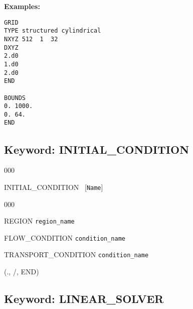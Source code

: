 \documentclass[12pt]{article}
\begin{document}
\noindent
{\bf Examples:}
\begin{verbatim}
GRID
TYPE structured cylindrical
NXYZ 512  1  32
DXYZ
2.d0
1.d0
2.d0
END

BOUNDS
0. 1000.
0. 64.
END
\end{verbatim}


\newpage
\protect\hypertarget{target_init}{}

\subsection{Keyword: INITIAL\_CONDITION}


\begin{deflist}{000}
\item[INITIAL\_CONDITION] \ [{\tt Name}]
\begin{deflist}{000}
\item[REGION] {\tt region\_name}
\item[FLOW\_CONDITION] {\tt condition\_name}
\item[TRANSPORT\_CONDITION] {\tt condition\_name}
\end{deflist}
\item[(., /, END)] ~
\end{deflist}




\newpage
\protect\hypertarget{target_linsolv}{}

\subsection{Keyword: LINEAR\_SOLVER}

\end{document}
